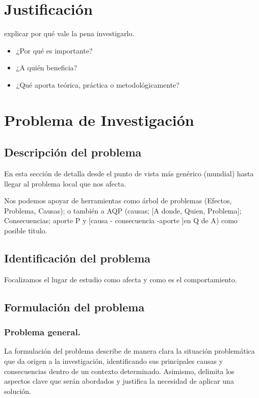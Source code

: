 \newpage

\section{Justificación}
explicar por qué vale la pena investigarlo.
\begin{itemize}
    \item ¿Por qué es importante?
    \item ¿A quién beneficia?
    \item ¿Qué aporta teórica, práctica o metodológicamente?
\end{itemize}


\section{Problema de Investigación}
\subsection{Descripción del problema}
En esta sección  de detalla desde el punto de vista más genérico (mundial) hasta llegar al problema local que nos afecta.\

Nos podemos apoyar de herramientas como árbol de problemas (Efectos, Problema, Causas); o también a AQP (causas; [A donde, Quien, Problema]; Consecuencias; aporte {P y [causa - consecuencia -aporte ]en Q de A}) como posible titulo.\

\subsection{Identificación del problema}
Focalizamos el lugar de estudio como afecta y como es el comportamiento.\

\subsection{Formulación del problema}
\subsubsection{Problema general.}
La formulación del problema describe de manera clara la situación problemática que da origen a la investigación, identificando sus principales causas y consecuencias dentro de un contexto determinado. Asimismo, delimita los aspectos clave que serán abordados y justifica la necesidad de aplicar una solución.

